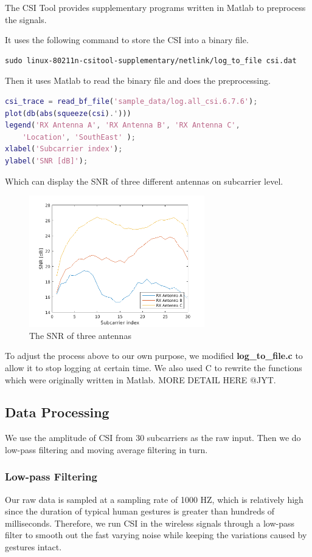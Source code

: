 \documentclass[conference]{IEEEtran}
\begin{document}
The CSI Tool provides supplementary programs written in Matlab to preprocess the signals.

It uses the following command to store the CSI into a binary file.
{ 
\scriptsize
\begin{lstlisting}[language=SH]
sudo linux-80211n-csitool-supplementary/netlink/log_to_file csi.dat
\end{lstlisting}
}

Then it uses Matlab to read the binary file and does the preprocessing.
{ 
\scriptsize
\begin{lstlisting}[language=MATLAB]
csi_trace = read_bf_file('sample_data/log.all_csi.6.7.6');
plot(db(abs(squeeze(csi).')))
legend('RX Antenna A', 'RX Antenna B', 'RX Antenna C', 
	'Location', 'SouthEast' );
xlabel('Subcarrier index');
ylabel('SNR [dB]');
\end{lstlisting}
}

Which can display the SNR of three different antennas on subcarrier level.
\begin{figure}[H]
\centering
\includegraphics[width=3in]{SNR.png}
\caption{The SNR of three antennas}
\end{figure}

To adjust the process above to our own purpose, we modified \textbf{log\_to\_file.c} to allow it to stop logging at certain time. We also used C to rewrite the functions which were originally written in Matlab. MORE DETAIL HERE @JYT.


\subsection{Data Processing}
We use the amplitude of CSI from 30 subcarriers as the raw input.
Then we do low-pass filtering and moving average filtering in turn.
\subsubsection{Low-pass Filtering}
Our raw data is sampled at a sampling rate of 1000 HZ, which is relatively high since the duration of typical human gestures is greater than hundreds of milliseconds. Therefore, we run CSI in the wireless signals through a low-pass filter to smooth out the fast varying noise while keeping the variations caused by gestures intact.
\end{document}
